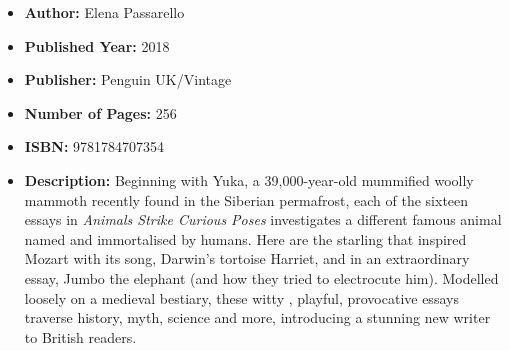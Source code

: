 \documentclass{tufte-handout}
\begin{document}
\begin{itemize}
    \item[] \textbf{Author:} Elena Passarello
    \item[] \textbf{Published Year:} 2018
    \item[] \textbf{Publisher:} Penguin UK/Vintage
    \item[] \textbf{Number of Pages:} 256  
    \item[] \textbf{ISBN:} 9781784707354
    \item[] \textbf{Description:} Beginning with Yuka, a 39,000-year-old mummified woolly mammoth recently found in the Siberian permafrost, each of the sixteen essays in \textit{Animals Strike Curious Poses} investigates a different famous animal named and immortalised by humans. Here are the starling that inspired Mozart with its song, Darwin’s tortoise Harriet, and in an extraordinary essay, Jumbo the elephant (and how they tried to electrocute him). Modelled loosely on a medieval bestiary, these witty , playful, provocative essays traverse history, myth, science and more, introducing a stunning new writer to British readers.
\end{itemize}
\end{document}
